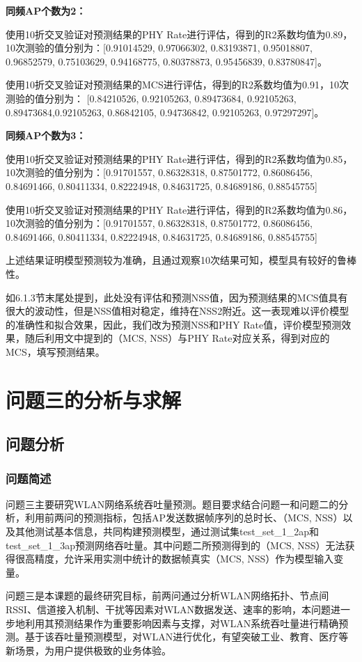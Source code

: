 \documentclass[bwprint]{gmcmthesis}
\begin{document}
\textbf{同频AP个数为2：}

使用10折交叉验证对预测结果的PHY Rate进行评估，得到的R2系数均值为0.89，10次测验的值分别为：[0.91014529, 0.97066302, 0.83193871, 0.95018807, 0.96852579,
0.75103629, 0.94168775, 0.80378873, 0.95456839, 0.83780847]。

使用10折交叉验证对预测结果的MCS进行评估，得到的R2系数均值为0.91，10次测验的值分别为：
[0.84210526, 0.92105263, 0.89473684, 0.92105263, 0.89473684,0.92105263, 0.86842105, 0.94736842, 0.92105263, 0.97297297]。

\textbf{同频AP个数为3：}

使用10折交叉验证对预测结果的PHY Rate进行评估，得到的R2系数均值为0.85，10次测验的值分别为：[0.91701557, 0.86328318, 0.87501772, 0.86086456, 0.84691466,
0.80411334, 0.82224948, 0.84631725, 0.84689186, 0.88545755]

使用10折交叉验证对预测结果的PHY Rate进行评估，得到的R2系数均值为0.86，10次测验的值分别为：[0.91701557, 0.86328318, 0.87501772, 0.86086456, 0.84691466,
       0.80411334, 0.82224948, 0.84631725, 0.84689186, 0.88545755]

上述结果证明模型预测较为准确，且通过观察10次结果可知，模型具有较好的鲁棒性。

如6.1.3节末尾处提到，此处没有评估和预测NSS值，因为预测结果的MCS值具有很大的波动性，但是NSS值相对稳定，维持在NSS2附近。这一表现难以评价模型的准确性和拟合效果，因此，我们改为预测NSS和PHY Rate值，评价模型预测效果，随后利用文中提到的（MCS, NSS）与PHY Rate对应关系，得到对应的MCS，填写预测结果。
\newpage
\section{问题三的分析与求解}
\subsection{问题分析}
\subsubsection{问题简述}
问题三主要研究WLAN网络系统吞吐量预测。题目要求结合问题一和问题二的分析，利用前两问的预测指标，包括AP发送数据帧序列的总时长、（MCS, NSS）以及其他测试基本信息，共同构建预测模型，通过测试集test\_set\_1\_2ap和test\_set\_1\_3ap预测网络吞吐量。其中问题二所预测得到的（MCS, NSS）无法获得很高精度，允许采用实测中统计的数据帧真实（MCS, NSS）作为模型输入变量。

问题三是本课题的最终研究目标，前两问通过分析WLAN网络拓扑、节点间RSSI、信道接入机制、干扰等因素对WLAN数据发送、速率的影响，本问题进一步地利用其预测结果作为重要影响因素与支撑，对WLAN系统吞吐量进行精确预测。基于该吞吐量预测模型，对WLAN进行优化，有望突破工业、教育、医疗等新场景，为用户提供极致的业务体验。
\end{document}
